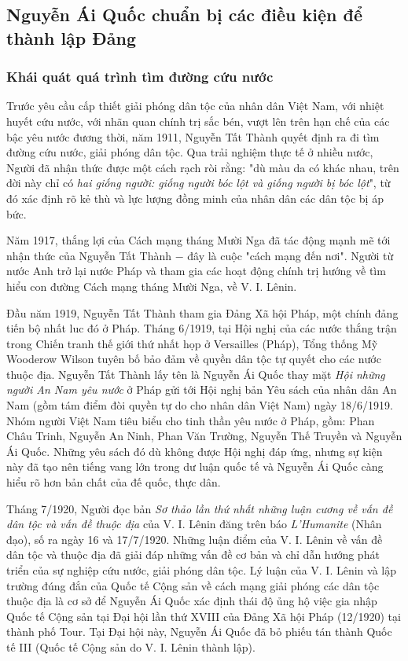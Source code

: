 \subsection{Nguyễn Ái Quốc chuẩn bị các điều kiện để thành lập Đảng}
\subsubsection{Khái quát quá trình tìm đường cứu nước}
Trước yêu cầu cấp thiết giải phóng dân tộc của nhân dân Việt Nam, với nhiệt huyết cứu nước, với nhãn quan chính trị sắc bén, vượt lên trên hạn chế của các bậc yêu nước đương thời, năm 1911, Nguyễn Tất Thành quyết định ra đi tìm đường cứu nước, giải phóng dân tộc. Qua trải nghiệm thực tế ở nhiều nước, Người đã nhận thức được một cách rạch ròi rằng: "dù màu da có khác nhau, trên đời này chỉ có \textit{hai giống người: giống người bóc lột và giống người bị bóc lột}", từ đó xác định rõ kẻ thù và lực lượng đồng minh của nhân dân các dân tộc bị áp bức.

Năm 1917, thắng lợi của Cách mạng tháng Mười Nga đã tác động mạnh mẽ tới nhận thức của Nguyễn Tất Thành $-$ đây là cuộc "cách mạng đến nơi". Người từ nước Anh trở lại nước Pháp và tham gia các hoạt động chính trị hướng về tìm hiểu con đường Cách mạng tháng Mười Nga, về V. I. Lênin.

Đầu năm 1919, Nguyễn Tất Thành tham gia Đảng Xã hội Pháp, một chính đảng tiến bộ nhất luc đó ở Pháp. Tháng 6/1919, tại Hội nghị của các nước thắng trận trong Chiến tranh thế giới thứ nhất họp ở Versailles (Pháp), Tổng thống Mỹ Wooderow Wilson tuyên bố bảo đảm về quyền dân tộc tự quyết cho các nước thuộc địa. Nguyễn Tất Thành lấy tên là Nguyễn Ái Quốc thay mặt \textit{Hội những người An Nam yêu nước} ở Pháp gửi tới Hội nghị bản Yêu sách của nhân dân An Nam (gồm tám điểm đòi quyền tự do cho nhân dân Việt Nam) ngày 18/6/1919. Nhóm người Việt Nam tiêu biểu cho tinh thần yêu nước ở Pháp, gồm: Phan Châu Trinh, Nguyễn An Ninh, Phan Văn Trường, Nguyễn Thế Truyền và Nguyễn Ái Quốc. Những yêu sách đó dù không được Hội nghị đáp ứng, nhưng sự kiện này đã tạo nên tiếng vang lớn trong dư luận quốc tế và Nguyễn Ái Quốc càng hiểu rõ hơn bản chất của đế quốc, thực dân.

Tháng 7/1920, Người đọc bản \textit{Sơ thảo lần thứ nhất những luận cương về vấn đề dân tộc và vấn đề thuộc địa} của V. I. Lênin đăng trên báo \textit{L'Humanite} (Nhân đạo), số ra ngày 16 và 17/7/1920. Những luận điểm của V. I. Lênin về vấn đề dân tộc và thuộc địa đã giải đáp những vấn đề cơ bản và chỉ dẫn hướng phát triển của sự nghiệp cứu nước, giải phóng dân tộc. Lý luận của V. I. Lênin và lập trường đúng đắn của Quốc tế Cộng sản về cách mạng giải phóng các dân tộc thuộc địa là cơ sở để Nguyễn Ái Quốc xác định thái độ ủng hộ việc gia nhập Quốc tế Cộng sản tại Đại hội lần thứ XVIII của Đảng Xã hội Pháp (12/1920) tại thành phố Tour. Tại Đại hội này, Nguyễn Ái Quốc đã bỏ phiếu tán thành Quốc tế III (Quốc tế Cộng sản do V. I. Lênin thành lập).

